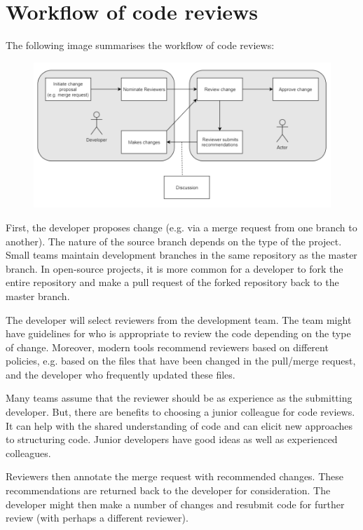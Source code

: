 \documentclass[a4paper, openany]{memoir}
\begin{document}
\section{Workflow of code reviews}
The following image summarises the workflow of code reviews:
\begin{figure}[H]
    \centering
    \includegraphics[scale=0.5]{src/7 code reviews workflow.PNG}
\end{figure}
First, the developer proposes change (e.g. via a merge request from one branch to another). The nature of the source branch depends on the type of the project. Small teams maintain development branches in the same repository as the master branch. In open-source projects, it is more common for a developer to fork the entire repository and make a pull request of the forked repository back to the master branch. 

The developer will select reviewers from the development team. The team might have guidelines for who is appropriate to review the code depending on the type of change. Moreover, modern tools recommend reviewers based on different policies, e.g. based on the files that have been changed in the pull/merge request, and the developer who frequently updated these files.

Many teams assume that the reviewer should be as experience as the submitting developer. But, there are benefits to choosing a junior colleague for code reviews. It can help with the shared understanding of code and can elicit new approaches to structuring code. Junior developers have good ideas as well as experienced colleagues.

Reviewers then annotate the merge request with recommended changes. These recommendations are returned back to the developer for consideration. The developer might then make a number of changes and resubmit code for further review (with perhaps a different reviewer). 
\end{document}
